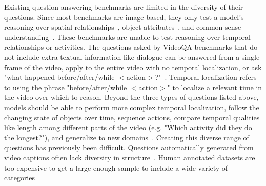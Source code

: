 \documentclass[10pt,twocolumn,letterpaper]{article}
\newcommand{\mgm}[1]{{\color{cyan}{mgm: #1}}}
\begin{document}
Existing question-answering benchmarks are limited in the diversity of their questions. Since most benchmarks are image-based, they only test a model's reasoning over spatial relationships~\cite{johnson2017clevr,hudson2019gqa,antol2015vqa,goyal2017making,krishna2017visual,zhu2016visual7w}, object attributes~\cite{johnson2017clevr,hudson2019gqa, antol2015vqa,goyal2017making,krishna2017visual}, and common sense understanding~\cite{zellers2019recognition,antol2015vqa,krishna2017visual}. These benchmarks are unable to test reasoning over temporal relationships or activities. \mgm{clearer common sense specification here}
The questions asked by VideoQA benchmarks that do not include extra textual information like dialogue can be answered from a single frame of the video, apply to the entire video with no temporal localization, or ask "what happened before/after/while $<$action$>$?"~\cite{jang2017tgif,xu2017video, maharaj2017dataset, zeng2016leveraging, yu2019activitynet}. \mgm{a very clunky way of bringing this up. However, I'm not sure how to do it more clearly yet. Think} Temporal localization refers to using the phrase "before/after/while $<$action$>$" to localize a relevant time in the video over which to reason. Beyond the three types of questions listed above, models should be able to perform more complex temporal localization, follow the changing state of objects over time, sequence actions, compare temporal qualities like length among different parts of the video (e.g. "Which activity did they do the longest?"), and generalize to new domains~\cite{lake2018generalization,vatashsky2020vqa}. \mgm{re-address this list with the templates we ended up with} Creating this diverse range of questions has previously been difficult. Questions automatically generated from video captions often lack diversity in structure~\cite{yu2019activitynet, jang2017tgif}. Human annotated datasets are too expensive to get a large enough sample to include a wide variety of categories~\cite{zeng2016leveraging, yu2019activitynet}
\end{document}
